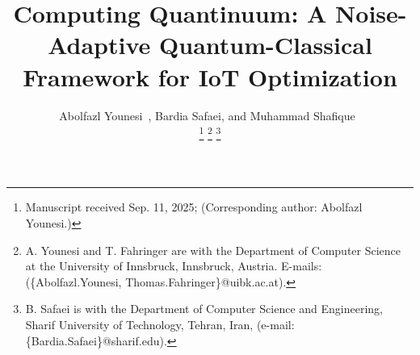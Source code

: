 \documentclass[lettersize,journal]{IEEEtran}
\begin{document}
\title{Computing Quantinuum: A Noise-Adaptive Quantum-Classical Framework for IoT Optimization\\
}



\author{

    Abolfazl Younesi~,
    Bardia Safaei,
    and Muhammad Shafique~
    
\thanks{Manuscript received Sep. 11, 2025; (Corresponding author: Abolfazl Younesi.)}
\thanks{A. Younesi and T. Fahringer are with the Department of Computer Science at the University of Innsbruck, Innsbruck, Austria. E-mails: (\{Abolfazl.Younesi, Thomas.Fahringer\}@uibk.ac.at).}
\thanks{B. Safaei is with the Department of Computer Science and  Engineering, Sharif University of Technology, Tehran, Iran, (e-mail: \{Bardia.Safaei\}@sharif.edu).}}



\maketitle
\end{document}
